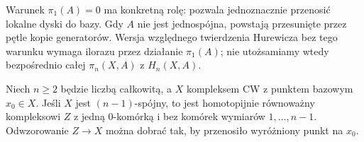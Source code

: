 \begin{uwaga}
Warunek $\pi_1(A)=0$ ma
konkretną rolę: pozwala
jednoznacznie przenosić
lokalne dyski do bazy.
Gdy $A$ nie jest
jednospójna, powstają
przesunięte przez pętle
kopie generatorów.
Wersja względnego
twierdzenia Hurewicza
bez tego warunku
wymaga ilorazu przez
działanie $\pi_1(A)$;
nie utożsamiamy wtedy
bezpośrednio całej
$\pi_n(X,A)$ z
$H_n(X,A)$.
\end{uwaga}

\begin{lemat}
\label{lem:model-wysoko-spojny}
Niech $n\geq2$ będzie liczbą całkowitą,
a $X$ kompleksem CW z punktem bazowym $x_0\in X$.
Jeśli $X$ jest $(n-1)$-spójny, to jest
homotopijnie równoważny
kompleksowi $Z$ z
jedną $0$-komórką
i bez komórek
wymiarów $1,\ldots,n-1$.
Odwzorowanie $Z\to X$
można dobrać tak,
by przenosiło
wyróżniony punkt
na $x_0$.
\end{lemat}

